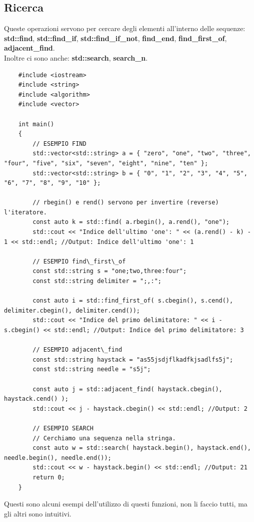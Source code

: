 \subsection{Ricerca}

\textsf{\small Queste operazioni servono per cercare degli elementi all'interno delle sequenze: \textbf{std::find}, \textbf{std::find\_if}, \textbf{std::find\_if\_not}, \textbf{find\_end}, \textbf{find\_first\_of}, \textbf{adjacent\_find}.} \\

\textsf{\small Inoltre ci sono anche: \textbf{std::search}, \textbf{search\_n}.} \\

\begin{lstlisting}
	#include <iostream>
	#include <string>
	#include <algorithm>
	#include <vector>
	
	int main()
	{
		// ESEMPIO FIND
		std::vector<std::string> a = { "zero", "one", "two", "three", "four", "five", "six", "seven", "eight", "nine", "ten" };
		std::vector<std::string> b = { "0", "1", "2", "3", "4", "5", "6", "7", "8", "9", "10" };
		
		// rbegin() e rend() servono per invertire (reverse) l'iteratore.
		const auto k = std::find( a.rbegin(), a.rend(), "one");
		std::cout << "Indice dell'ultimo 'one': " << (a.rend() - k) - 1 << std::endl; //Output: Indice dell'ultimo 'one': 1
		
		// ESEMPIO find\_first\_of
		const std::string s = "one;two,three:four";
		const std::string delimiter = ";,:";
		
		const auto i = std::find_first_of( s.cbegin(), s.cend(), delimiter.cbegin(), delimiter.cend());
		std::cout << "Indice del primo delimitatore: " << i - s.cbegin() << std::endl; //Output: Indice del primo delimitatore: 3
		
		// ESEMPIO adjacent\_find
		const std::string haystack = "as55jsdjflkadfkjsadlfs5j";
		const std::string needle = "s5j";
		
		const auto j = std::adjacent_find( haystack.cbegin(), haystack.cend() );
		std::cout << j - haystack.cbegin() << std::endl; //Output: 2
		
		// ESEMPIO SEARCH
		// Cerchiamo una sequenza nella stringa.
		const auto w = std::search( haystack.begin(), haystack.end(), needle.begin(), needle.end());
		std::cout << w - haystack.begin() << std::endl; //Output: 21
		return 0;
	}
\end{lstlisting}

\textsf{\small Questi sono alcuni esempi dell'utilizzo di questi funzioni, non li faccio tutti, ma gli altri sono intuitivi.} \\

